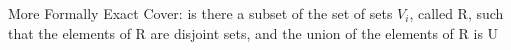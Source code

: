 \documentclass[preview]{standalone}
\begin{document}
\begin{center}
More Formally \n Exact Cover:  is there a subset of the set of sets ${V_i}$, called R,
such that the elements of R are disjoint sets, and the union of
the elements of R is U
\end{center}
\end{document}
